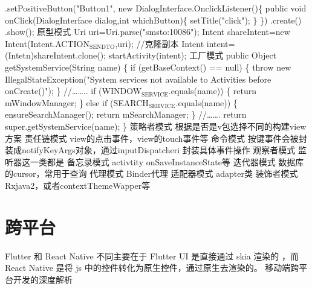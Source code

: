\documentclass[9pt, b5paper]{article}
\begin{document}
 .setPositiveButton("Button1", new DialogInterface.OnclickListener()\{ 
       public void onClick(DialogInterface dialog,int whichButton)\{ 
             setTitle("click"); 
        \} 
 \}) 
 .create() 
 .show();
原型模式
Uri uri=Uri.parse("smsto:10086"); 
Intent shareIntent=new Intent(Intent.ACTION$_{\text{SENDTO}}$,uri); 
//克隆副本 
Intent intent=(Intetn)shareIntent.clone(); startActivity(intent);
工厂模式
public Object getSystemService(String name) \{ 
      if (getBaseContext() == null) \{ 
          throw new IllegalStateException("System services not available to Activities before onCreate()"); 
     \}
    //\ldots{}\ldots{}.. 
      if (WINDOW$_{\text{SERVICE}}$.equals(name)) \{ 
          return mWindowManager; 
     \} else if (SEARCH$_{\text{SERVICE}}$.equals(name)) \{ 
         ensureSearchManager(); 
          return mSearchManager; 
     \} //\ldots{}\ldots{}. 
      return super.getSystemService(name); \}
策略者模式
根据是否是v包选择不同的构建view方案
责任链模式
view的点击事件，view的touch事件等
命令模式
按键事件会被封装成notifyKeyArgs对象，通过inputDispatcheri 封装具体事件操作
观察者模式
监听器这一类都是
备忘录模式
activtity onSaveInstanceState等
迭代器模式
数据库的cursor，常用于查询
代理模式
Binder代理
适配器模式
adapter类
装饰者模式
Rxjava2，或者contextThemeWapper等
\section{跨平台}
\label{sec-16}
Flutter 和 React Native 不同主要在于 Flutter UI 是直接通过 skia 渲染的 ，而 React Native 是将 js 中的控件转化为原生控件，通过原生去渲染的。
移动端跨平台开发的深度解析
\end{document}

